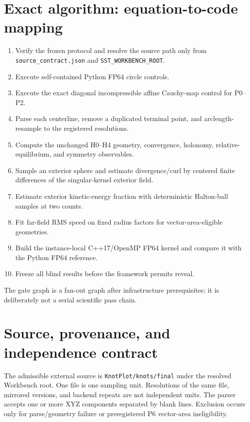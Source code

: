 \documentclass[11pt,a4paper]{article}
\begin{document}
\section{Exact algorithm: equation-to-code mapping}
\begin{enumerate}[label=S\arabic*.]
\item Verify the frozen protocol and resolve the source path only from \texttt{source\_contract.json} and \texttt{SST\_WORKBENCH\_ROOT}.
\item Execute self-contained Python FP64 circle controls.
\item Execute the exact diagonal incompressible affine Cauchy-map control for P0--P2.
\item Parse each centerline, remove a duplicated terminal point, and arclength-resample to the registered resolutions.
\item Compute the unchanged H0--H4 geometry, convergence, holonomy, relative-equilibrium, and symmetry observables.
\item Sample an exterior sphere and estimate divergence/curl by centered finite differences of the singular-kernel exterior field.
\item Estimate exterior kinetic-energy fraction with deterministic Halton-ball samples at two counts.
\item Fit far-field RMS speed on fixed radius factors for vector-area-eligible geometries.
\item Build the instance-local C++17/OpenMP FP64 kernel and compare it with the Python FP64 reference.
\item Freeze all blind results before the framework permits reveal.
\end{enumerate}
The gate graph is a fan-out graph after infrastructure prerequisites; it is deliberately not a serial scientific pass chain.

\section{Source, provenance, and independence contract}
The admissible external source is \texttt{KnotPlot/knots/final} under the resolved Workbench root. One file is one sampling unit. Resolutions of the same file, mirrored versions, and backend repeats are not independent units. The parser accepts one or more XYZ components separated by blank lines. Exclusion occurs only for parse/geometry failure or preregistered P6 vector-area ineligibility.
\end{document}
